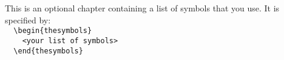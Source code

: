 
\begin{thesymbols}
This is an optional chapter containing a list of symbols that
you use. It is specified by:\\[2ex]
\verb|  \begin{thesymbols}|\\
\verb|    <your list of symbols>|\\
\verb|  \end{thesymbols}|
\end{thesymbols}
